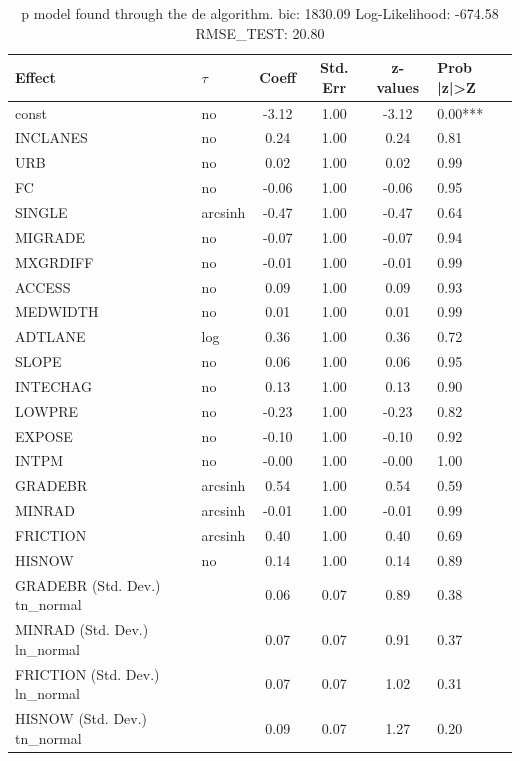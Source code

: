 \begin{table}
	\caption{p model found through the de algorithm. bic: 1830.09 Log-Likelihood: -674.58 RMSE_TEST: 20.80}
	\begin{center}
		\begin{tabular}{|l|l|c|c|c|l|}
			\hline
			Effect & $\tau$ & Coeff & Std. Err & z-values & Prob |z|>Z \\
			\hline
			const & no & -3.12 & 1.00 & -3.12 & 0.00*** \\
			\hline
			INCLANES & no & 0.24 & 1.00 & 0.24 & 0.81 \\
			\hline
			URB & no & 0.02 & 1.00 & 0.02 & 0.99 \\
			\hline
			FC & no & -0.06 & 1.00 & -0.06 & 0.95 \\
			\hline
			SINGLE & arcsinh & -0.47 & 1.00 & -0.47 & 0.64 \\
			\hline
			MIGRADE & no & -0.07 & 1.00 & -0.07 & 0.94 \\
			\hline
			MXGRDIFF & no & -0.01 & 1.00 & -0.01 & 0.99 \\
			\hline
			ACCESS & no & 0.09 & 1.00 & 0.09 & 0.93 \\
			\hline
			MEDWIDTH & no & 0.01 & 1.00 & 0.01 & 0.99 \\
			\hline
			ADTLANE & log & 0.36 & 1.00 & 0.36 & 0.72 \\
			\hline
			SLOPE & no & 0.06 & 1.00 & 0.06 & 0.95 \\
			\hline
			INTECHAG & no & 0.13 & 1.00 & 0.13 & 0.90 \\
			\hline
			LOWPRE & no & -0.23 & 1.00 & -0.23 & 0.82 \\
			\hline
			EXPOSE & no & -0.10 & 1.00 & -0.10 & 0.92 \\
			\hline
			INTPM & no & -0.00 & 1.00 & -0.00 & 1.00 \\
			\hline
			GRADEBR & arcsinh & 0.54 & 1.00 & 0.54 & 0.59 \\
			\hline
			MINRAD & arcsinh & -0.01 & 1.00 & -0.01 & 0.99 \\
			\hline
			FRICTION & arcsinh & 0.40 & 1.00 & 0.40 & 0.69 \\
			\hline
			HISNOW & no & 0.14 & 1.00 & 0.14 & 0.89 \\
			\hline
			GRADEBR (Std. Dev.) tn_normal &  & 0.06 & 0.07 & 0.89 & 0.38 \\
			\hline
			MINRAD (Std. Dev.) ln_normal &  & 0.07 & 0.07 & 0.91 & 0.37 \\
			\hline
			FRICTION (Std. Dev.) ln_normal &  & 0.07 & 0.07 & 1.02 & 0.31 \\
			\hline
			HISNOW (Std. Dev.) tn_normal &  & 0.09 & 0.07 & 1.27 & 0.20 \\
			\hline
		\end{tabular}
	\end{center}
\end{table}